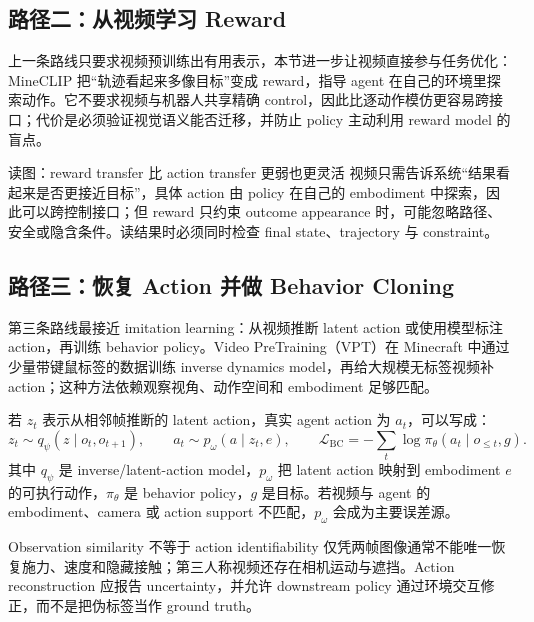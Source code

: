 \subsection{路径二：从视频学习 Reward}

上一条路线只要求视频预训练出有用表示，本节进一步让视频直接参与任务优化：MineCLIP 把“轨迹看起来多像目标”变成 reward，指导 agent 在自己的环境里探索动作。它不要求视频与机器人共享精确 control，因此比逐动作模仿更容易跨接口；代价是必须验证视觉语义能否迁移，并防止 policy 主动利用 reward model 的盲点。


\begin{knowledgebox}{读图：reward transfer 比 action transfer 更弱也更灵活}
视频只需告诉系统“结果看起来是否更接近目标”，具体 action 由 policy 在自己的 embodiment 中探索，因此可以跨控制接口；但 reward 只约束 outcome appearance 时，可能忽略路径、安全或隐含条件。读结果时必须同时检查 final state、trajectory 与 constraint。
\end{knowledgebox}

\subsection{路径三：恢复 Action 并做 Behavior Cloning}

第三条路线最接近 imitation learning：从视频推断 latent action 或使用模型标注 action，再训练 behavior policy。Video PreTraining（VPT）在 Minecraft 中通过少量带键鼠标签的数据训练 inverse dynamics model，再给大规模无标签视频补 action；这种方法依赖观察视角、动作空间和 embodiment 足够匹配。


若 $z_t$ 表示从相邻帧推断的 latent action，真实 agent action 为 $a_t$，可以写成：
\[
z_t\sim q_\psi(z\mid o_t,o_{t+1}),\qquad
a_t\sim p_\omega(a\mid z_t,e),\qquad
\mathcal{L}_{\mathrm{BC}}=-\sum_t\log\pi_\theta(a_t\mid o_{\le t},g).
\]
其中 $q_\psi$ 是 inverse/latent-action model，$p_\omega$ 把 latent action 映射到 embodiment $e$ 的可执行动作，$\pi_\theta$ 是 behavior policy，$g$ 是目标。若视频与 agent 的 embodiment、camera 或 action support 不匹配，$p_\omega$ 会成为主要误差源。

\begin{warningbox}{Observation similarity 不等于 action identifiability}
仅凭两帧图像通常不能唯一恢复施力、速度和隐藏接触；第三人称视频还存在相机运动与遮挡。Action reconstruction 应报告 uncertainty，并允许 downstream policy 通过环境交互修正，而不是把伪标签当作 ground truth。
\end{warningbox}

